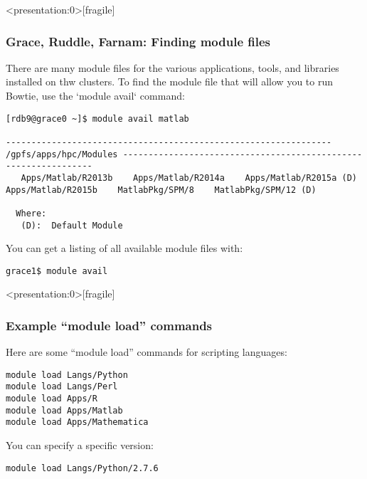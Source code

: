 \documentclass[10pt]{beamer}
\begin{document}
\begin{frame}<presentation:0>[fragile]
\frametitle{Grace, Ruddle, Farnam: Finding module files}
There are many module files for the various applications, tools, and
libraries installed on thw clusters.  To find the module file that
will allow you to run Bowtie, use the `module avail` command:

\begin{verbatim}
[rdb9@grace0 ~]$ module avail matlab

---------------------------------------------------------------- /gpfs/apps/hpc/Modules ----------------------------------------------------------------
   Apps/Matlab/R2013b    Apps/Matlab/R2014a    Apps/Matlab/R2015a (D)    Apps/Matlab/R2015b    MatlabPkg/SPM/8    MatlabPkg/SPM/12 (D)

  Where:
   (D):  Default Module

\end{verbatim}

You can get a listing of all available module files with:
\begin{verbatim}
grace1$ module avail
\end{verbatim}
\end{frame}

\begin{frame}<presentation:0>[fragile]
\frametitle{Example ``module load'' commands}
Here are some ``module load'' commands for scripting languages:

\begin{verbatim}
module load Langs/Python
module load Langs/Perl
module load Apps/R
module load Apps/Matlab
module load Apps/Mathematica
\end{verbatim}

You can specify a specific version:
\begin{verbatim}
module load Langs/Python/2.7.6
\end{verbatim}

\end{frame}
\end{document}
